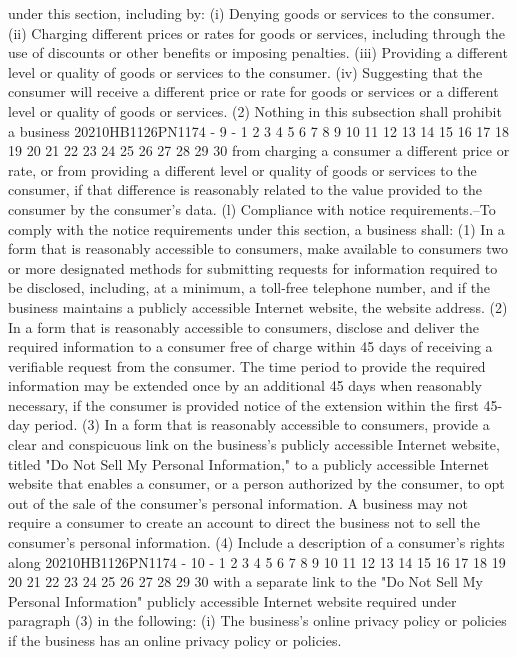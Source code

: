 under this section, including by:
(i) Denying goods or services to the consumer.
(ii) Charging different prices or rates for goods or
services, including through the use of discounts or other
benefits or imposing penalties.
(iii) Providing a different level or quality of
goods or services to the consumer.
(iv) Suggesting that the consumer will receive a
different price or rate for goods or services or a
different level or quality of goods or services.
(2) Nothing in this subsection shall prohibit a business
20210HB1126PN1174 - 9 -
1
2
3
4
5
6
7
8
9
10
11
12
13
14
15
16
17
18
19
20
21
22
23
24
25
26
27
28
29
30
from charging a consumer a different price or rate, or from
providing a different level or quality of goods or services
to the consumer, if that difference is reasonably related to
the value provided to the consumer by the consumer's data.
(l) Compliance with notice requirements.--To comply with the
notice requirements under this section, a business shall:
(1) In a form that is reasonably accessible to
consumers, make available to consumers two or more designated
methods for submitting requests for information required to
be disclosed, including, at a minimum, a toll-free telephone
number, and if the business maintains a publicly accessible
Internet website, the website address.
(2) In a form that is reasonably accessible to
consumers, disclose and deliver the required information to a
consumer free of charge within 45 days of receiving a
verifiable request from the consumer. The time period to
provide the required information may be extended once by an
additional 45 days when reasonably necessary, if the consumer
is provided notice of the extension within the first 45-day
period.
(3) In a form that is reasonably accessible to
consumers, provide a clear and conspicuous link on the
business's publicly accessible Internet website, titled "Do
Not Sell My Personal Information," to a publicly accessible
Internet website that enables a consumer, or a person
authorized by the consumer, to opt out of the sale of the
consumer's personal information. A business may not require a
consumer to create an account to direct the business not to
sell the consumer's personal information.
(4) Include a description of a consumer's rights along
20210HB1126PN1174 - 10 -
1
2
3
4
5
6
7
8
9
10
11
12
13
14
15
16
17
18
19
20
21
22
23
24
25
26
27
28
29
30
with a separate link to the "Do Not Sell My Personal
Information" publicly accessible Internet website required
under paragraph (3) in the following:
(i) The business's online privacy policy or policies
if the business has an online privacy policy or policies.
